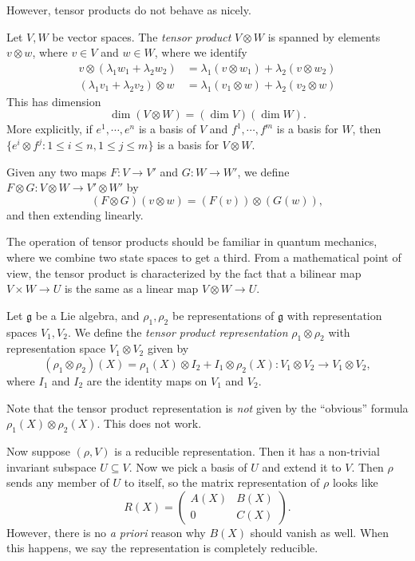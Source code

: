 \documentclass[a4paper]{article}
\begin{document}
However, tensor products do not behave as nicely.
\begin{defi}
  Let $V, W$ be vector spaces. The \emph{tensor product} $V \otimes W$ is spanned by elements $v \otimes w$, where $v \in V$ and $w \in W$, where we identify
  \begin{align*}
    v \otimes (\lambda_1 w_1 + \lambda_2 w_2) &= \lambda_1 (v \otimes w_1) + \lambda_2 (v \otimes w_2)\\
    (\lambda_1 v_1 + \lambda_2 v_2) \otimes w &= \lambda_1 (v_1 \otimes w) + \lambda_2 (v_2 \otimes w)
  \end{align*}
  This has dimension
  \[
    \dim (V \otimes W) = (\dim V)(\dim W).
  \]
  More explicitly, if $e^1, \cdots, e^n$ is a basis of $V$ and $f^1 ,\cdots, f^m$ is a basis for $W$, then $\{e^i \otimes f^j: 1 \leq i \leq n, 1 \leq j \leq m\}$ is a basis for $V \otimes W$.

  Given any two maps $F: V \to V'$ and $G: W \to W'$, we define $F \otimes G: V \otimes W \to V' \otimes W'$ by
  \[
    (F \otimes G) (v \otimes w) = (F(v)) \otimes (G(w)),
  \]
  and then extending linearly.
\end{defi}
The operation of tensor products should be familiar in quantum mechanics, where we combine two state spaces to get a third. From a mathematical point of view, the tensor product is characterized by the fact that a bilinear map $V \times W \to U$ is the same as a linear map $V \otimes W \to U$.

\begin{defi}
  Let $\mathfrak{g}$ be a Lie algebra, and $\rho_1, \rho_2$ be representations of $\mathfrak{g}$ with representation spaces $V_1, V_2$. We define the \emph{tensor product representation} $\rho_1 \otimes \rho_2$ with representation space $V_1 \otimes V_2$ given by
  \[
    (\rho_1 \otimes \rho_2)(X) = \rho_1(X) \otimes I_2 + I_1 \otimes \rho_2(X): V_1 \otimes V_2 \to V_1 \otimes V_2,
  \]
  where $I_1$ and $I_2$ are the identity maps on $V_1$ and $V_2$.
\end{defi}

Note that the tensor product representation is \emph{not} given by the ``obvious'' formula $\rho_1(X) \otimes \rho_2(X)$. This does not work.

Now suppose $(\rho, V)$ is a reducible representation. Then it has a non-trivial invariant subspace $U \subseteq V$. Now we pick a basis of $U$ and extend it to $V$. Then $\rho$ sends any member of $U$ to itself, so the matrix representation of $\rho$ looks like
\[
  R(X) =
  \begin{pmatrix}
    A(X) & B(X)\\
    0 & C(X)
  \end{pmatrix}.
\]
However, there is no \emph{a priori} reason why $B(X)$ should vanish as well. When this happens, we say the representation is completely reducible.
\end{document}
